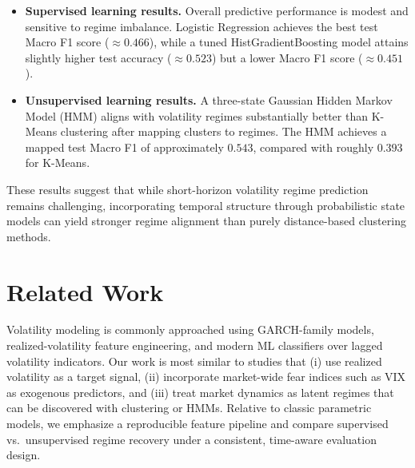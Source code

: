 \documentclass[11pt]{article}
\begin{document}
\begin{itemize}
\item \textbf{Supervised learning results.} Overall predictive performance is modest and sensitive to regime imbalance. Logistic Regression achieves the best test Macro F1 score ($\approx 0.466$), while a tuned HistGradientBoosting model attains slightly higher test accuracy ($\approx 0.523$) but a lower Macro F1 score ($\approx 0.451$).

\item \textbf{Unsupervised learning results.} A three-state Gaussian Hidden Markov Model (HMM) aligns with volatility regimes substantially better than K-Means clustering after mapping clusters to regimes. The HMM achieves a mapped test Macro F1 of approximately $0.543$, compared with roughly $0.393$ for K-Means.
\end{itemize}

These results suggest that while short-horizon volatility regime prediction remains challenging, incorporating temporal structure through probabilistic state models can yield stronger regime alignment than purely distance-based clustering methods.

\section{Related Work}
Volatility modeling is commonly approached using GARCH-family models, realized-volatility feature engineering, and modern ML classifiers over lagged volatility indicators. Our work is most similar to studies that (i) use realized volatility as a target signal, (ii) incorporate market-wide fear indices such as VIX as exogenous predictors, and (iii) treat market dynamics as latent regimes that can be discovered with clustering or HMMs. Relative to classic parametric models, we emphasize a reproducible feature pipeline and compare supervised vs.\ unsupervised regime recovery under a consistent, time-aware evaluation design.
\end{document}
